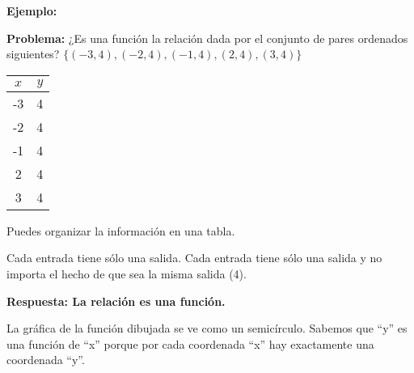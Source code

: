\documentclass[12pt,a4paper]{article}
\begin{document}
\begin{tcolorbox}[colback=fondorosa,colframe=rojoclaro,title=\textbf{MINI-EXPLICACIÓN: CONCEPTO DE FUNCIONES},breakable]
\textbf{Ejemplo:}

\textbf{Problema:} ¿Es una función la relación dada por el conjunto de pares ordenados siguientes? $\{(-3, 4), (-2, 4), (-1, 4), (2, 4), (3, 4)\}$

\begin{center}
\begin{tabular}{|c|c|}
\hline
$x$ & $y$ \\
\hline
-3 & 4 \\
-2 & 4 \\
-1 & 4 \\
2 & 4 \\
3 & 4 \\
\hline
\end{tabular}
\end{center}

Puedes organizar la información en una tabla.

Cada entrada tiene sólo una salida. Cada entrada tiene sólo una salida y no importa el hecho de que sea la misma salida (4).

\textbf{Respuesta: La relación es una función.}

\vspace{0.5cm}

La gráfica de la función dibujada se ve como un semicírculo. Sabemos que ``y'' es una función de ``x'' porque por cada coordenada ``x'' hay exactamente una coordenada ``y''.

\begin{center}
\shorthandoff{<>}
\shorthandon{<>}
\end{center}

\end{tcolorbox}

\vspace{5mm}

\end{document}
